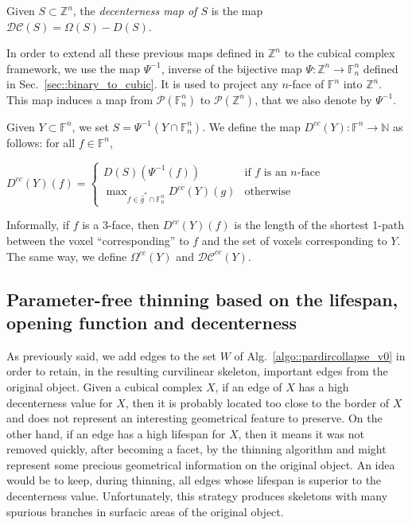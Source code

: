 \documentclass[final,envcountsame]{llncs}
\def\mydist1{D}
\def\mydd1{\Omega}
\def\mydecent{\mathcal{DC}}
\def\Dist1#1{\mydist1(#1)}
\def\DD1#1{\mydd1(#1)}
\def\decent#1{\mydecent(#1)}
\def\cplDist1#1{\mydist1^{cc}(#1)}
\def\cplDD1#1{\mydd1^{cc}(#1)}
\def\cpldecent#1{\mydecent^{cc}(#1)}
\def\myem#1{{\em #1}}
\def\quotes#1{``#1''}
\def\V2C{\Psi}
\def\Nset{\mathbb{N}}
\def\Zset{\Z}
\def\Nset{\mathbb{N}}
\def\Z{\mathbb{Z}}
\def\allfaces#1{\mathbb{F}^{#1}}
\def\subfaces#1#2{\allfaces{#1}_{#2}}
\def\cellstrict#1{\hat{#1}^*}
\def\inter{\cap}
\begin{document}
\begin{definition}
\label{def::decenterness_map}
Given $S \subset \Zset^n$, the \myem{decenterness map of $S$} is the map $\decent{S} = \DD1{S} - \Dist1{S}$.
\end{definition}

In order to extend all these previous maps defined in $\Zset^n$ to the cubical complex framework, we use the map $\V2C^{-1}$, inverse of the bijective map $\V2C : \Zset^{n} \rightarrow \subfaces{n}{n}$ defined in Sec.~\ref{sec::binary_to_cubic}. It is used to project any $n$-face of $\allfaces{n}$ into $\Zset^n$. This map induces a map from $\mathcal{P}(\subfaces{n}{n})$ to $\mathcal{P}(\Zset^n)$, that we also denote by $\V2C^{-1}$.

Given $Y \subset \allfaces{n}$, we set $S = \V2C^{-1}(Y \inter \subfaces{n}{n})$. We define the map $\cplDist1{Y}: \allfaces{n} \rightarrow \Nset$ as follows: for all $f \in \allfaces{n}$,

\bigskip
\begin{math}
\cplDist1{Y}(f) = \left\{
\begin{array}{ll}
\Dist1{S}(\V2C^{-1}(f)) & \text{if $f$ is an $n$-face}\\
\displaystyle \max_{f \in \cellstrict{g} \inter \subfaces{n}{n}} \cplDist1{Y}(g) & \text{otherwise}
\end{array}
\right.
\end{math}

Informally, if $f$ is a 3-face, then $\cplDist1{Y}(f)$ is the length of the shortest 1-path between the voxel \quotes{corresponding} to $f$ and the set of voxels corresponding to $Y$.
The same way, we define $\cplDD1{Y}$ and $\cpldecent{Y}$.


\subsection{Parameter-free thinning based on the lifespan, opening function and decenterness}
As previously said, we add edges to the set $W$ of Alg.~\ref{algo::pardircollapse_v0} in order to retain, in the resulting curvilinear skeleton, important edges from the original object. Given a cubical complex $X$, if an edge of $X$ has a high decenterness value for $X$, then it is probably located too close to the border of $X$ and does not represent an interesting geometrical feature to preserve.
On the other hand, if an edge has a high lifespan for $X$, then it means it was not removed quickly, after becoming a facet, by the thinning algorithm and might represent some precious geometrical information on the original object. An idea would be to keep, during thinning, all edges whose lifespan is superior to the decenterness value. Unfortunately, this strategy produces skeletons with many spurious branches in surfacic areas of the original object.
\end{document}
